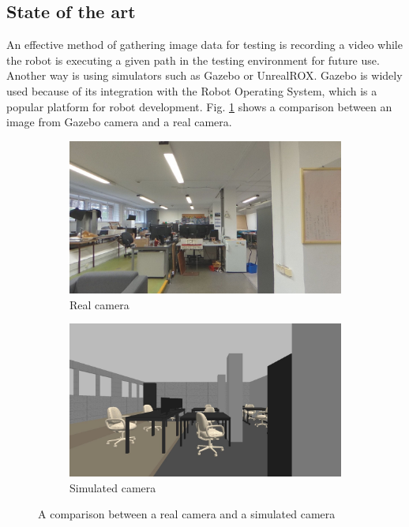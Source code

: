 \documentclass{svproc}
\begin{document}
\subsection{State of the art}
An effective method of gathering image data for testing is recording a video while the robot is executing a given path in the testing environment for future use.
Another way is using simulators such as Gazebo or UnrealROX. \cite{koenig2004design,martinez2018unrealrox}
Gazebo is widely used because of its integration with the Robot Operating System, which is a popular platform for robot development.
Fig. \ref{fig:gazebo_vs_real} shows a comparison between an image from Gazebo camera and a real camera.
\begin{figure}[!ht]
    \begin{subfigure}{0.46\textwidth}
        \includegraphics[width=\linewidth]{img/gazebo_vs_real/real.jpg}
        \caption{Real camera}
    \end{subfigure}\hfill%
    \begin{subfigure}{0.46\textwidth}
        \includegraphics[width=\linewidth]{img/gazebo_vs_real/gazebo.jpg}
        \caption{Simulated camera}
    \end{subfigure}
    \caption{A comparison between a real camera and a simulated camera}
    \label{fig:gazebo_vs_real}
\end{figure}
\end{document}

